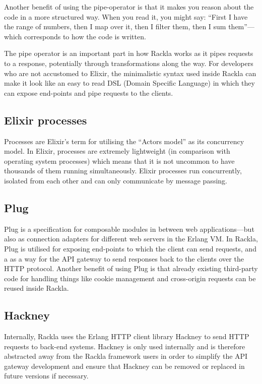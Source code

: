 \documentclass{cslthse-msc}
\begin{document}
Another benefit of using the pipe-operator is that it makes you reason about the code in a more structured way. When you read it, you might say: \enquote{First I have the range of numbers, then I map over it, then I filter them, then I sum them}---which corresponds to how the code is written.

The pipe operator is an important part in how Rackla works as it pipes requests to a response, potentially through transformations along the way. For developers who are not accustomed to Elixir, the minimalistic syntax used inside Rackla can make it look like an easy to read DSL (Domain Specific Language) in which they can expose end-points and pipe requests to the clients.

\subsection{Elixir processes}
Processes are Elixir's term for utilising the \enquote{Actors model} as its concurrency model. In Elixir, processes are extremely lightweight (in comparison with operating system processes) which means that it is not uncommon to have thousands of them running simultaneously. Elixir processes run concurrently, isolated from each other and can only communicate by message passing\cite{elixir_processes}.

\subsection{Plug}
Plug is a specification for composable modules in between web applications---but also as connection adapters for different web servers in the Erlang VM\cite{plug}. In Rackla, Plug is utilised for exposing end-points to which the client can send requests, and a as a way for the API gateway to send responses back to the clients over the HTTP protocol. Another benefit of using Plug is that already existing third-party code for handling things like cookie management and cross-origin requests can be reused inside Rackla.

\subsection{Hackney}
Internally, Rackla uses the Erlang HTTP client library Hackney\cite{hackney} to send HTTP requests to back-end systems. Hackney is only used internally and is therefore abstracted away from the Rackla framework users in order to simplify the API gateway development and ensure that Hackney can be removed or replaced in future versions if necessary.
\end{document}
